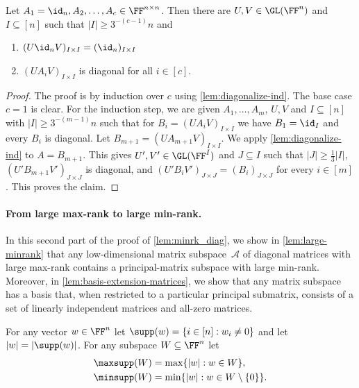 \begin{lemma}\label{lem:diagonalize}
Let $A_1 = \id_n, A_2, \ldots, A_c \in \FF^{n \times n}$. Then there are $U,V \in \GL(\FF^n)$ and $I \subseteq [n]$ such that $|I| \geq 3^{-(c-1)} n$ and
\begin{enumerate}[\upshape (i)]
    \item $(U \id_n V)_{I\times I} = (\id_n)_{I\times I}$
    \item $(UA_i V)_{I \times I}$ is diagonal for all $i \in [c]$.
\end{enumerate}
\end{lemma}
\begin{proof}
    The proof is by induction over $c$ using \autoref{lem:diagonalize-ind}. 
    The base case $c = 1$ is clear.
    For the induction step, we are given $A_1, \ldots, A_m$, $U,V$ and $I \subseteq[n]$ with $|I| \geq 3^{-(m-1)}n$ such that for $B_i = (UA_i V)_{I \times I}$ we have $B_1 = \id_I$ and every $B_i$ is diagonal.
    Let $B_{m+1} = (U A_{m+1} V)_{I \times I}$. We apply \autoref{lem:diagonalize-ind} to $A = B_{m+1}$. This gives $U', V' \in \GL(\FF^I)$ and $J \subseteq I$ such that $|J| \geq \tfrac13 |I|$, $(U' B_{m+1} V')_{J \times J}$ is diagonal, and $(U' B_i V')_{J \times J} = (B_i)_{J \times J}$ for every $i \in [m]$. This proves the claim.
\end{proof}

\paragraph{From large max-rank to large min-rank.}
In this second part of the proof of \autoref{lem:minrk_diag}, we show in \autoref{lem:large-minrank} that any low-dimensional matrix subspace~$\mathcal A$ of diagonal matrices with large max-rank contains a principal-matrix subspace with large min-rank.
Moreover, in \autoref{lem:basis-extension-matrices}, we show that any matrix subspace has a basis that, when restricted to a particular principal submatrix, consists of a set of linearly independent matrices and all-zero matrices.

For any vector $w \in \FF^n$ let $\supp(w) = \{i \in [n]: w_i \neq 0\}$ and let $|w| = |\supp(w)|$. For any subspace $W \subseteq \FF^n$ let
\begin{align*}
\maxsupp(W) &= \max \{ |w| : w \in W\},\\
\minsupp(W) &= \min \{ |w| : w \in W \setminus \{0\}\}.
\end{align*}

